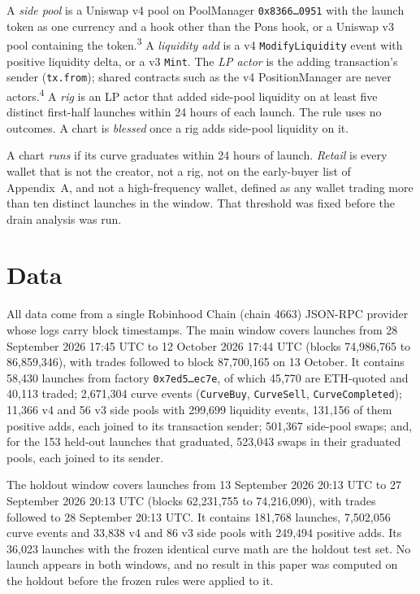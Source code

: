 \documentclass{ledger}
\newcommand{\n}[1]{\textsuperscript{#1}}
\begin{document}
A \emph{side pool} is a Uniswap v4 pool on PoolManager \texttt{0x8366\ldots0951} with the launch token as one currency and a hook other than the Pons hook, or a Uniswap v3 pool containing the token.\n{3} A \emph{liquidity add} is a v4 \texttt{ModifyLiquidity} event with positive liquidity delta, or a v3 \texttt{Mint}. The \emph{LP actor} is the adding transaction's sender (\texttt{tx.from}); shared contracts such as the v4 PositionManager are never actors.\n{4} A \emph{rig} is an LP actor that added side-pool liquidity on at least five distinct first-half launches within 24 hours of each launch. The rule uses no outcomes. A chart is \emph{blessed} once a rig adds side-pool liquidity on it.

A chart \emph{runs} if its curve graduates within 24 hours of launch. \emph{Retail} is every wallet that is not the creator, not a rig, not on the early-buyer list of Appendix~A, and not a high-frequency wallet, defined as any wallet trading more than ten distinct launches in the window. That threshold was fixed before the drain analysis was run.

\section{Data}\label{data}

All data come from a single Robinhood Chain (chain 4663) JSON-RPC provider whose logs carry block timestamps. The main window covers launches from 28 September 2026 17:45 UTC to 12 October 2026 17:44 UTC (blocks 74,986,765 to 86,859,346), with trades followed to block 87,700,165 on 13 October. It contains 58,430 launches from factory \texttt{0x7ed5\ldots ec7e}, of which 45,770 are ETH-quoted and 40,113 traded; 2,671,304 curve events (\texttt{CurveBuy}, \texttt{CurveSell}, \texttt{CurveCompleted}); 11,366 v4 and 56 v3 side pools with 299,699 liquidity events, 131,156 of them positive adds, each joined to its transaction sender; 501,367 side-pool swaps; and, for the 153 held-out launches that graduated, 523,043 swaps in their graduated pools, each joined to its sender.

The holdout window covers launches from 13 September 2026 20:13 UTC to 27 September 2026 20:13 UTC (blocks 62,231,755 to 74,216,090), with trades followed to 28 September 20:13 UTC. It contains 181,768 launches, 7,502,056 curve events and 33,838 v4 and 86 v3 side pools with 249,494 positive adds. Its 36,023 launches with the frozen identical curve math are the holdout test set. No launch appears in both windows, and no result in this paper was computed on the holdout before the frozen rules were applied to it.
\end{document}
